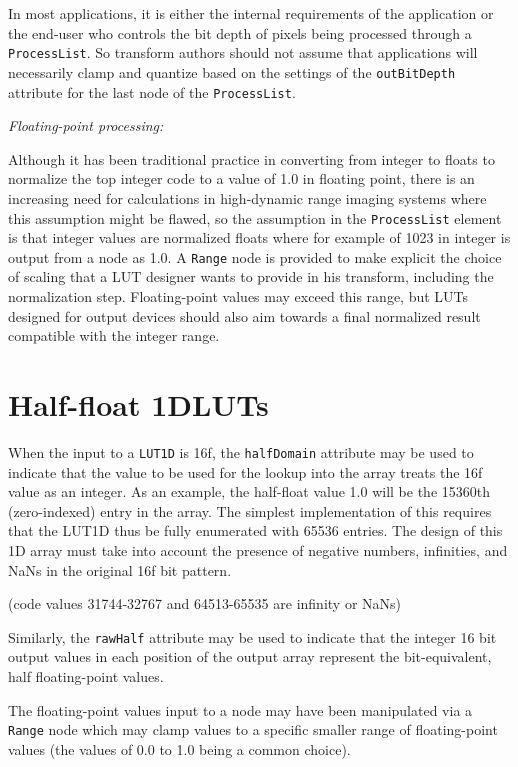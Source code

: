 In most applications, it is either the internal requirements of the application or the end-user who controls the bit depth of pixels being processed through a \texttt{ProcessList}. So transform authors should not assume that applications will necessarily clamp and quantize based on the settings of the \texttt{outBitDepth} attribute for the last node of the \texttt{ProcessList}.

\textit{Floating-point processing:}

Although it has been traditional practice in converting from integer to floats to normalize the top integer code to a value of 1.0 in floating point, there is an increasing need for calculations in high-dynamic range imaging systems where this assumption might be flawed, so the assumption in the \texttt{ProcessList} element is that integer values are normalized floats where for example of 1023 in integer is output from a node as 1.0. A \texttt{Range} node is provided to make explicit the choice of scaling that a LUT designer wants to provide in his transform, including the normalization step. Floating-point values may exceed this range, but LUTs designed for output devices should also aim towards a final normalized result compatible with the integer range.

\section{Half-float 1DLUTs}
When the input to a \texttt{LUT1D} is 16f, the \texttt{halfDomain} attribute may be used to indicate that the value to be used for the lookup into the array treats the 16f value as an integer. As an example, the half-float value 1.0 will be the 15360th (zero-indexed) entry in the array. The simplest implementation of this requires that the LUT1D thus be fully enumerated with 65536 entries. The design of this 1D array must take into account the presence of negative numbers, infinities, and NaNs in the original 16f bit pattern.

(code values 31744-32767 and 64513-65535 are infinity or NaNs)

Similarly, the \texttt{rawHalf} attribute may be used to indicate that the integer 16 bit output values in each position of the output array represent the bit-equivalent, half floating-point values.  

The floating-point values input to a node may have been manipulated via a \texttt{Range} node which may clamp values to a specific smaller range of floating-point values (the values of 0.0 to 1.0 being a common choice).  


